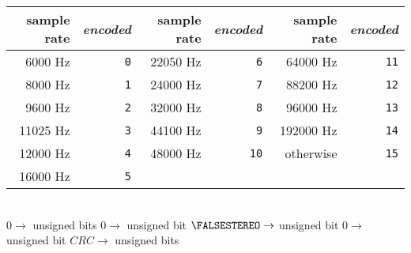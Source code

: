{\begin{tabular}{rr|rr|rr}
  sample rate & \textit{encoded} &
  sample rate & \textit{encoded} &
  sample rate & \textit{encoded} \\
  \hline
  6000 Hz & \texttt{0} &
  22050 Hz & \texttt{6} &
  64000 Hz & \texttt{11} \\
  8000 Hz & \texttt{1} &
  24000 Hz & \texttt{7} &
  88200 Hz & \texttt{12} \\
  9600 Hz & \texttt{2} &
  32000 Hz & \texttt{8} &
  96000 Hz & \texttt{13} \\
  11025 Hz & \texttt{3} &
  44100 Hz & \texttt{9} &
  192000 Hz & \texttt{14} \\
  12000 Hz & \texttt{4} &
  48000 Hz & \texttt{10} &
  otherwise & \texttt{15} \\
  16000 Hz & \texttt{5} \\
\end{tabular} \\
$0 \rightarrow$  unsigned bits
$0 \rightarrow$  unsigned bit
$\FALSESTEREO \rightarrow$  unsigned bit
$0 \rightarrow$  unsigned bit
$CRC \rightarrow$  unsigned bits\;
\EALGORITHM
}
